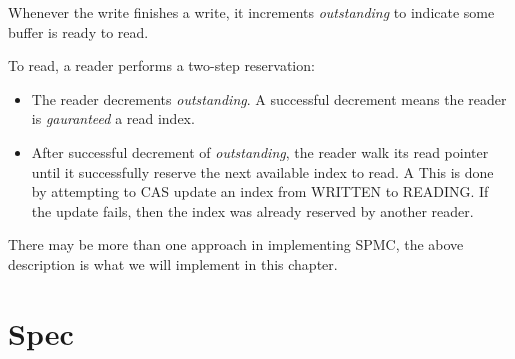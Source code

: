 Whenever the write finishes a write, it increments \textit{outstanding} to
indicate some buffer is ready to read.\newline 

To read, a reader performs a two-step reservation: 
\begin{itemize}
    \item The reader decrements \textit{outstanding}. A successful decrement means
    the reader is \textit{gauranteed} a read index.
    \item After successful decrement of \textit{outstanding}, the reader walk
    its read pointer until it successfully reserve the next available index to
    read. A This is done by attempting to CAS update an index from WRITTEN to
    READING. If the update fails, then the index was already reserved by another 
    reader.
\end{itemize}

There may be more than one approach in implementing SPMC, the above description
is what we will implement in this chapter.





\section{Spec}

